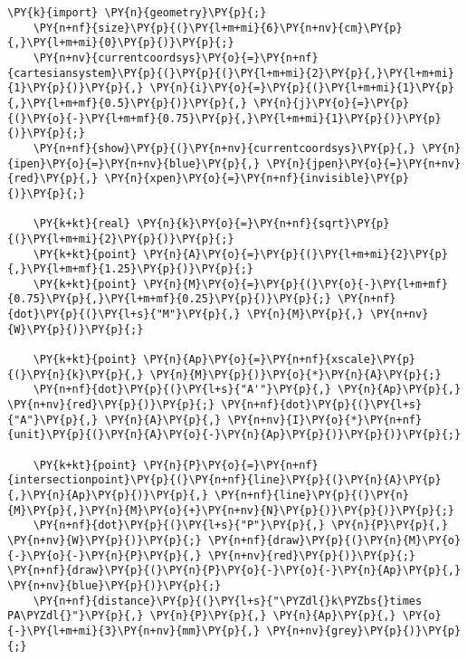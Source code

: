 \begin{Verbatim}[commandchars=\\\{\}]
    \PY{k}{import} \PY{n}{geometry}\PY{p}{;}
    \PY{n+nf}{size}\PY{p}{(}\PY{l+m+mi}{6}\PY{n+nv}{cm}\PY{p}{,}\PY{l+m+mi}{0}\PY{p}{)}\PY{p}{;}
    \PY{n+nv}{currentcoordsys}\PY{o}{=}\PY{n+nf}{cartesiansystem}\PY{p}{(}\PY{p}{(}\PY{l+m+mi}{2}\PY{p}{,}\PY{l+m+mi}{1}\PY{p}{)}\PY{p}{,} \PY{n}{i}\PY{o}{=}\PY{p}{(}\PY{l+m+mi}{1}\PY{p}{,}\PY{l+m+mf}{0.5}\PY{p}{)}\PY{p}{,} \PY{n}{j}\PY{o}{=}\PY{p}{(}\PY{o}{-}\PY{l+m+mf}{0.75}\PY{p}{,}\PY{l+m+mi}{1}\PY{p}{)}\PY{p}{)}\PY{p}{;}
    \PY{n+nf}{show}\PY{p}{(}\PY{n+nv}{currentcoordsys}\PY{p}{,} \PY{n}{ipen}\PY{o}{=}\PY{n+nv}{blue}\PY{p}{,} \PY{n}{jpen}\PY{o}{=}\PY{n+nv}{red}\PY{p}{,} \PY{n}{xpen}\PY{o}{=}\PY{n+nf}{invisible}\PY{p}{)}\PY{p}{;}

    \PY{k+kt}{real} \PY{n}{k}\PY{o}{=}\PY{n+nf}{sqrt}\PY{p}{(}\PY{l+m+mi}{2}\PY{p}{)}\PY{p}{;}
    \PY{k+kt}{point} \PY{n}{A}\PY{o}{=}\PY{p}{(}\PY{l+m+mi}{2}\PY{p}{,}\PY{l+m+mf}{1.25}\PY{p}{)}\PY{p}{;}
    \PY{k+kt}{point} \PY{n}{M}\PY{o}{=}\PY{p}{(}\PY{o}{-}\PY{l+m+mf}{0.75}\PY{p}{,}\PY{l+m+mf}{0.25}\PY{p}{)}\PY{p}{;} \PY{n+nf}{dot}\PY{p}{(}\PY{l+s}{"M"}\PY{p}{,} \PY{n}{M}\PY{p}{,} \PY{n+nv}{W}\PY{p}{)}\PY{p}{;}

    \PY{k+kt}{point} \PY{n}{Ap}\PY{o}{=}\PY{n+nf}{xscale}\PY{p}{(}\PY{n}{k}\PY{p}{,} \PY{n}{M}\PY{p}{)}\PY{o}{*}\PY{n}{A}\PY{p}{;}
    \PY{n+nf}{dot}\PY{p}{(}\PY{l+s}{"A'"}\PY{p}{,} \PY{n}{Ap}\PY{p}{,} \PY{n+nv}{red}\PY{p}{)}\PY{p}{;} \PY{n+nf}{dot}\PY{p}{(}\PY{l+s}{"A"}\PY{p}{,} \PY{n}{A}\PY{p}{,} \PY{n+nv}{I}\PY{o}{*}\PY{n+nf}{unit}\PY{p}{(}\PY{n}{A}\PY{o}{-}\PY{n}{Ap}\PY{p}{)}\PY{p}{)}\PY{p}{;}

    \PY{k+kt}{point} \PY{n}{P}\PY{o}{=}\PY{n+nf}{intersectionpoint}\PY{p}{(}\PY{n+nf}{line}\PY{p}{(}\PY{n}{A}\PY{p}{,}\PY{n}{Ap}\PY{p}{)}\PY{p}{,} \PY{n+nf}{line}\PY{p}{(}\PY{n}{M}\PY{p}{,}\PY{n}{M}\PY{o}{+}\PY{n+nv}{N}\PY{p}{)}\PY{p}{)}\PY{p}{;}
    \PY{n+nf}{dot}\PY{p}{(}\PY{l+s}{"P"}\PY{p}{,} \PY{n}{P}\PY{p}{,} \PY{n+nv}{W}\PY{p}{)}\PY{p}{;} \PY{n+nf}{draw}\PY{p}{(}\PY{n}{M}\PY{o}{-}\PY{o}{-}\PY{n}{P}\PY{p}{,} \PY{n+nv}{red}\PY{p}{)}\PY{p}{;} \PY{n+nf}{draw}\PY{p}{(}\PY{n}{P}\PY{o}{-}\PY{o}{-}\PY{n}{Ap}\PY{p}{,} \PY{n+nv}{blue}\PY{p}{)}\PY{p}{;}
    \PY{n+nf}{distance}\PY{p}{(}\PY{l+s}{"\PYZdl{}k\PYZbs{}times PA\PYZdl{}"}\PY{p}{,} \PY{n}{P}\PY{p}{,} \PY{n}{Ap}\PY{p}{,} \PY{o}{-}\PY{l+m+mi}{3}\PY{n+nv}{mm}\PY{p}{,} \PY{n+nv}{grey}\PY{p}{)}\PY{p}{;}
\end{Verbatim}
